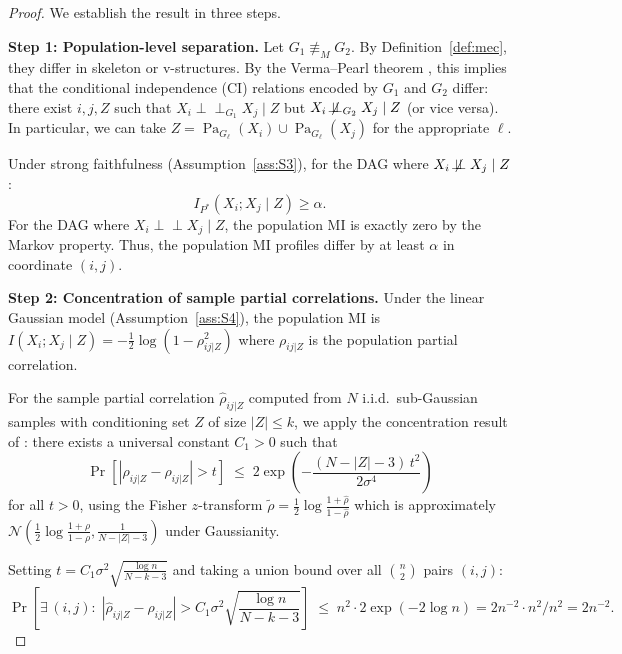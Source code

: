 \documentclass{article}
\theoremstyle{definition}
\theoremstyle{plain}
\theoremstyle{remark}
\DeclareMathOperator{\Pa}{Pa}
\newcommand{\indep}{\perp\!\!\!\perp}
\newcommand{\nindep}{\not\!\perp\!\!\!\perp}
\begin{document}
\begin{proof}
We establish the result in three steps.

\textbf{Step 1: Population-level separation.}
Let $G_1 \not\equiv_M G_2$. By Definition~\ref{def:mec}, they differ in skeleton
or v-structures. By the Verma--Pearl theorem \citep{verma1990equivalence}, this
implies that the conditional independence (CI) relations encoded by $G_1$ and
$G_2$ differ: there exist $i, j, Z$ such that $X_i \indep_{G_1} X_j \mid Z$ but
$X_i \nindep_{G_2} X_j \mid Z$ (or vice versa). In particular, we can take
$Z = \Pa_{G_\ell}(X_i) \cup \Pa_{G_\ell}(X_j)$ for the appropriate $\ell$.

Under strong faithfulness (Assumption~\ref{ass:S3}), for the DAG where
$X_i \nindep X_j \mid Z$:
\begin{equation}
  \label{eq:pop_sep}
  I_{P^*}(X_i; X_j \mid Z) \geq \alpha.
\end{equation}
For the DAG where $X_i \indep X_j \mid Z$, the population MI is exactly zero by
the Markov property. Thus, the population MI profiles differ by at least $\alpha$
in coordinate $(i, j)$.

\textbf{Step 2: Concentration of sample partial correlations.}
Under the linear Gaussian model (Assumption~\ref{ass:S4}), the population MI is
$I(X_i; X_j \mid Z) = -\frac{1}{2}\log(1 - \rho_{ij|Z}^2)$ where $\rho_{ij|Z}$
is the population partial correlation.

For the sample partial correlation $\hat{\rho}_{ij|Z}$ computed from $N$ i.i.d.\
sub-Gaussian samples with conditioning set $Z$ of size $|Z| \leq k$, we apply
the concentration result of \citet{kalisch2007estimating}: there exists a
universal constant $C_1 > 0$ such that
\begin{equation}
  \label{eq:pcor_conc}
  \Pr\!\left[|\hat{\rho}_{ij|Z} - \rho_{ij|Z}| > t\right]
  \;\leq\; 2\exp\!\left(-\frac{(N - |Z| - 3)\,t^2}{2\sigma^4}\right)
\end{equation}
for all $t > 0$, using the Fisher $z$-transform
$\tilde{\rho} = \frac{1}{2}\log\frac{1+\hat{\rho}}{1-\hat{\rho}}$ which is
approximately $\mathcal{N}(\frac{1}{2}\log\frac{1+\rho}{1-\rho},
\frac{1}{N-|Z|-3})$ under Gaussianity.

Setting $t = C_1\sigma^2\sqrt{\frac{\log n}{N - k - 3}}$ and taking a union bound
over all $\binom{n}{2}$ pairs $(i, j)$:
\begin{equation}
  \Pr\!\left[\exists\, (i,j):\; |\hat{\rho}_{ij|Z} - \rho_{ij|Z}|
  > C_1\sigma^2\sqrt{\frac{\log n}{N - k - 3}}\right]
  \;\leq\; n^2 \cdot 2\exp(-2\log n) = 2n^{-2} \cdot n^2 / n^2 = 2n^{-2}.
\end{equation}


\end{proof}
\end{document}
